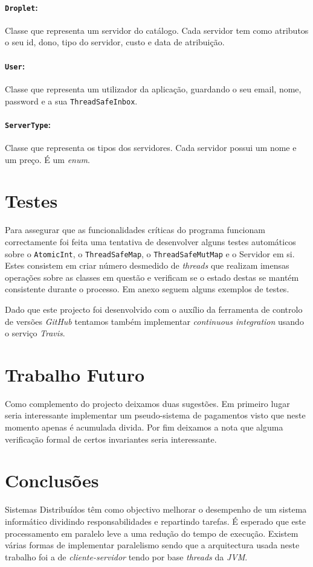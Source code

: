 \documentclass[a4paper]{article}
\begin{document}
\paragraph{\texttt{Droplet}:}
Classe que representa um servidor do catálogo. Cada servidor tem como atributos o seu id, dono, tipo do servidor, custo e data de atribuição.

\paragraph{\texttt{User}:}
Classe que representa um utilizador da aplicação, guardando o seu email, nome, password e a sua \texttt{ThreadSafeInbox}.

\paragraph{\texttt{ServerType}:}
Classe que representa os tipos dos servidores. Cada servidor possui um nome e um preço. É um \textit{enum}.

\section{Testes}
Para assegurar que as funcionalidades críticas do programa funcionam correctamente foi feita uma tentativa de desenvolver alguns testes automáticos sobre o \texttt{AtomicInt}, o \texttt{ThreadSafeMap}, o \texttt{ThreadSafeMutMap} e o Servidor em si. Estes consistem em criar número desmedido de \textit{threads} que realizam imensas operações sobre as classes em questão e verificam se o estado destas se mantém consistente durante o processo. Em anexo seguem alguns exemplos de testes.

Dado que este projecto foi desenvolvido com o auxílio da ferramenta de controlo de versões \textit{GitHub} tentamos também implementar \textit{continuous integration} usando o serviço \textit{Travis}.

\section{Trabalho Futuro}

Como complemento do projecto deixamos duas sugestões.
Em primeiro lugar seria interessante implementar um pseudo-sistema de pagamentos visto que neste momento apenas é acumulada divida.
Por fim deixamos a nota que alguma verificação formal de certos invariantes seria interessante.

\section{Conclusões}
Sistemas Distribuídos têm como objectivo melhorar o desempenho de um sistema informático dividindo responsabilidades e repartindo tarefas. É esperado que este processamento em paralelo leve a uma redução do tempo de execução.
Existem várias formas de implementar paralelismo sendo que a arquitectura usada neste trabalho foi a de \textit{cliente-servidor} tendo por base \textit{threads} da \textit{JVM}. 
\end{document}
